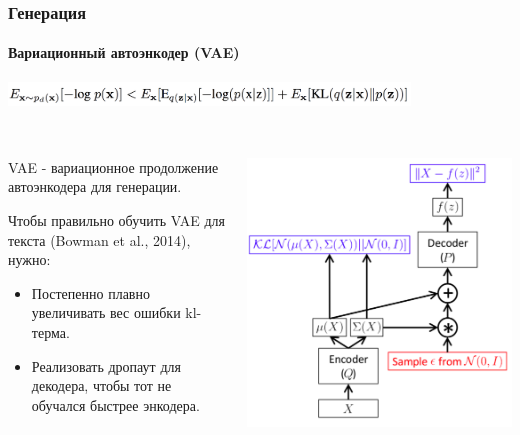 \documentclass[10pt]{beamer}
\begin{document}
\begin{frame}
\frametitle{Генерация}
\framesubtitle{Вариационный автоэнкодер (VAE)}


\begin{center}
    \includegraphics[width=0.8\textwidth]{images/elbo.png} \\
    \vskip-5mm \\
    \begin{columns}
        \begin{column}{0.5\textwidth}
            VAE - вариационное продолжение автоэнкодера для генерации.
            
            Чтобы правильно обучить VAE для текста (Bowman et al., 2014), нужно:
            \begin{itemize}
                \item Постепенно плавно увеличивать вес ошибки kl-терма.
                \item Реализовать дропаут для декодера, чтобы тот не обучался быстрее энкодера.
            \end{itemize}
        \end{column}
        \begin{column}{0.5\textwidth}
            \begin{center}
                \includegraphics[width=\textwidth]{images/vae_terms.png}
            \end{center}
        \end{column}
    \end{columns}
\end{center}

\end{frame}
\end{document}
